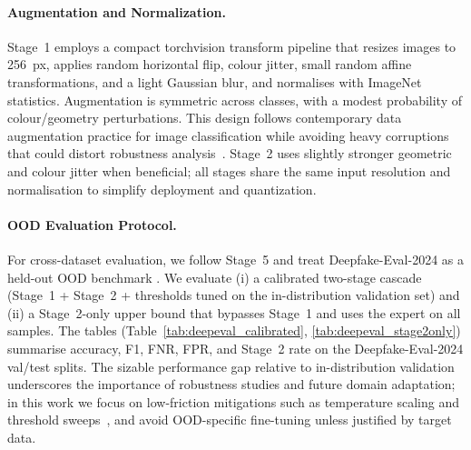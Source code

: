 \paragraph{Augmentation and Normalization.} Stage~1 employs a compact torchvision transform pipeline that resizes images to \SI{256}{px}, applies random horizontal flip, colour jitter, small random affine transformations, and a light Gaussian blur, and normalises with ImageNet statistics. Augmentation is symmetric across classes, with a modest probability of colour/geometry perturbations. This design follows contemporary data augmentation practice for image classification while avoiding heavy corruptions that could distort robustness analysis~\cite{buslaev2018albumentations,pei2024deepfakesurvey}. Stage~2 uses slightly stronger geometric and colour jitter when beneficial; all stages share the same input resolution and normalisation to simplify deployment and quantization.

\paragraph{OOD Evaluation Protocol.} For cross\hyp dataset evaluation, we follow Stage~5 and treat Deepfake\hyp Eval\hyp 2024 as a held\hyp out OOD benchmark \cite{deepeval2024}. We evaluate (i) a calibrated two\hyp stage cascade (Stage~1 + Stage~2 + thresholds tuned on the in\hyp distribution validation set) and (ii) a Stage~2\hyp only upper bound that bypasses Stage~1 and uses the expert on all samples. The tables (Table~\ref{tab:deepeval_calibrated}, \ref{tab:deepeval_stage2only}) summarise accuracy, F1, FNR, FPR, and Stage~2 rate on the Deepfake\hyp Eval\hyp 2024 val/test splits. The sizable performance gap relative to in\hyp distribution validation underscores the importance of robustness studies and future domain adaptation; in this work we focus on low\hyp friction mitigations such as temperature scaling and threshold sweeps~\cite{guo2017calibration,minderer2021revisiting}, and avoid OOD\hyp specific fine\hyp tuning unless justified by target data.


